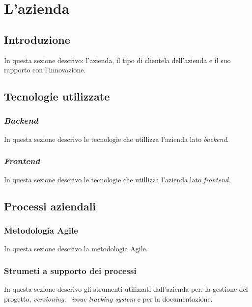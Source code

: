 
\chapter{L'azienda}
\label{cap:azienda}
\section{Introduzione}
In questa sezione descrivo: l'azienda, il tipo di clientela dell'azienda e il suo rapporto con l'innovazione.

\section{Tecnologie utilizzate}

\subsection{\emph{Backend}}
In questa sezione descrivo le tecnologie che utillizza l'azienda lato \emph{backend}.

\subsection{\emph{Frontend}}
In questa sezione descrivo le tecnologie che utillizza l'azienda lato \emph{frontend}.

\section{Processi aziendali}

\subsection{Metodologia Agile}
In questa sezione descrivo la metodologia Agile.

\subsection{Strumeti a supporto dei processi}
In questa sezione descrivo gli strumenti utilizzati dall'azienda per: la gestione del progetto, \emph{versioning}, \
\emph{issue tracking system} e per la documentazione.
